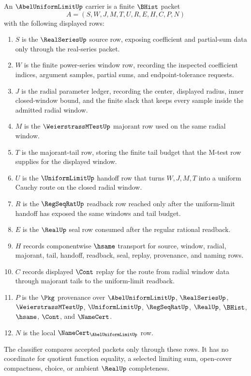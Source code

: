 \begin{definition}
\label{def:abel-uniform-limit-carrier}
An $\AbelUniformLimitUp$ carrier is a finite $\BHist$ packet
$$
A=(S,W,J,M,T,U,R,E,H,C,P,N)
$$
with the following displayed rows:
\begin{enumerate}
\item $S$ is the $\RealSeriesUp$ source row, exposing coefficient and partial-sum data only through the real-series packet.
\item $W$ is the finite power-series window row, recording the inspected coefficient indices, argument samples, partial sums, and endpoint-tolerance requests.
\item $J$ is the radial parameter ledger, recording the center, displayed radius, inner closed-window bound, and the finite slack that keeps every sample inside the admitted radial window.
\item $M$ is the $\WeierstrassMTestUp$ majorant row used on the same radial window.
\item $T$ is the majorant-tail row, storing the finite tail budget that the M-test row supplies for the displayed window.
\item $U$ is the $\UniformLimitUp$ handoff row that turns $W,J,M,T$ into a uniform Cauchy route on the closed radial window.
\item $R$ is the $\RegSeqRatUp$ readback row reached only after the uniform-limit handoff has exposed the same windows and tail budget.
\item $E$ is the $\RealUp$ seal row consumed after the regular rational readback.
\item $H$ records componentwise $\hsame$ transport for source, window, radial, majorant, tail, handoff, readback, seal, replay, provenance, and naming rows.
\item $C$ records displayed $\Cont$ replay for the route from radial window data through majorant tails to the uniform-limit readback.
\item $P$ is the $\Pkg$ provenance over $\AbelUniformLimitUp$, $\RealSeriesUp$, $\WeierstrassMTestUp$, $\UniformLimitUp$, $\RegSeqRatUp$, $\RealUp$, $\BHist$, $\hsame$, $\Cont$, and $\NameCert$.
\item $N$ is the local $\NameCert_{\AbelUniformLimitUp}$ row.
\end{enumerate}
The classifier compares accepted packets only through these rows. It has no coordinate for quotient function equality, a selected limiting sum, open-cover compactness, choice, or ambient $\RealUp$ completeness.
\end{definition}

